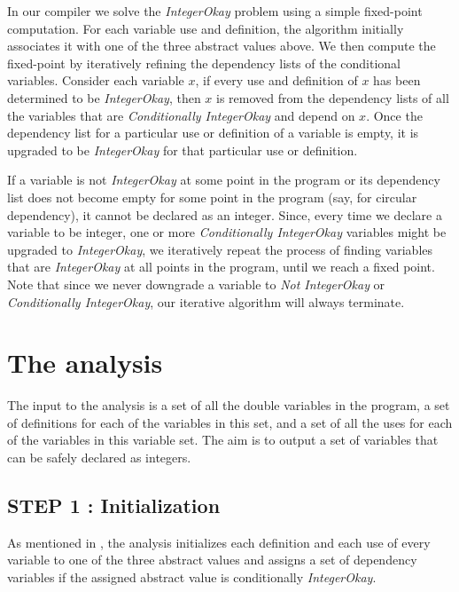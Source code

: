 In our \mixten compiler we solve the \emph{IntegerOkay} problem using a
simple fixed-point computation.   For each variable use and definition,
the algorithm initially associates it with one of the three abstract
values above.  
We then compute the fixed-point by iteratively refining the dependency lists
of the conditional variables.  Consider each variable $x$, if every use
and definition of $x$ has been determined to be \emph{IntegerOkay}, then
$x$ is removed from the dependency lists of all the variables that are
\emph{Conditionally IntegerOkay} and depend on $x$.  Once the dependency
list for a particular use or definition of a variable is empty, it is
upgraded to be \emph{IntegerOkay} for that particular use or definition.

If a variable is not \emph{IntegerOkay} at some point in the program or
its dependency list does not become empty for some point in the program
(say, for circular dependency), it cannot be declared as an integer.
Since, every time we declare a variable to be integer, one or more
\emph{Conditionally IntegerOkay} variables might be upgraded to
\emph{IntegerOkay}, we iteratively repeat the process of finding
variables that are \emph{IntegerOkay} at all points in the program,
until we reach a fixed point. Note that since we never downgrade a
variable to \emph{Not IntegerOkay} or \emph{Conditionally IntegerOkay},
our iterative algorithm will always terminate. 


\section{The analysis}

The input to the analysis is a set of all the double variables in the program,
a set of definitions for each of the variables in this set, and a set of all
the uses for each of the variables in this variable set. The aim is to output a
set of variables that can be safely declared as integers.
%

\subsection{STEP 1 : Initialization}

As mentioned in , the analysis initializes each
definition and each use of every variable to one of the three abstract values
and assigns a set of dependency variables if the assigned abstract value is
conditionally \emph{IntegerOkay}. 

